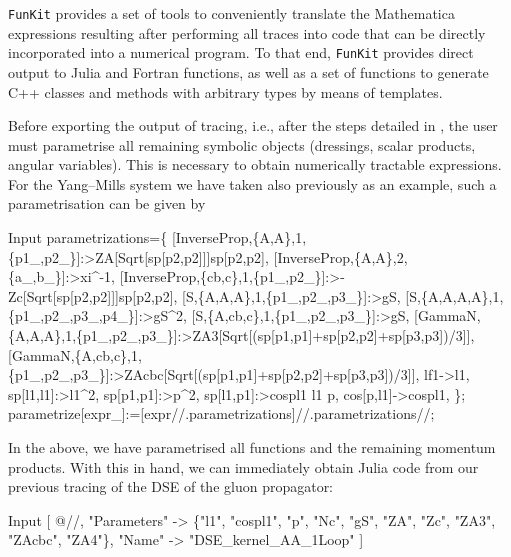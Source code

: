 \documentclass[preprint,10pt,sort&compress]{elsarticle}
\newcommand{\mathem}{\mmaInlineCell{Code}}
\newcommand{\FunKit}{\texttt{FunKit}\xspace}
\begin{document}
\FunKit provides a set of tools to conveniently translate the Mathematica expressions resulting after performing all traces into code that can be directly incorporated into a numerical program.
To that end, \FunKit provides direct output to Julia and Fortran functions, as well as a set of functions to generate C++ classes and methods with arbitrary types by means of templates.

Before exporting the output of tracing, i.e., after the steps detailed in , the user must parametrise all remaining symbolic objects (dressings, scalar products, angular variables). This is necessary to obtain numerically tractable expressions. For the Yang--Mills system we have taken also previously as an example, such a parametrisation can be given by
%
\begin{mmaCell}{Input}
parametrizations=\{
	[InverseProp,\{A,A\},1,\{p1_,p2_\}]:>ZA[Sqrt[sp[p2,p2]]]sp[p2,p2],
	[InverseProp,\{A,A\},2,\{a_,b_\}]:>xi^-1,
	[InverseProp,\{cb,c\},1,\{p1_,p2_\}]:>-Zc[Sqrt[sp[p2,p2]]]sp[p2,p2],
	[S,\{A,A,A\},1,\{p1_,p2_,p3_\}]:>gS,
	[S,\{A,A,A,A\},1,\{p1_,p2_,p3_,p4_\}]:>gS^2,
	[S,\{A,cb,c\},1,\{p1_,p2_,p3_\}]:>gS,
	[GammaN,\{A,A,A\},1,\{p1_,p2_,p3_\}]:>ZA3[Sqrt[(sp[p1,p1]+sp[p2,p2]+sp[p3,p3])/3]],
	[GammaN,\{A,cb,c\},1,\{p1_,p2_,p3_\}]:>ZAcbc[Sqrt[(sp[p1,p1]+sp[p2,p2]+sp[p3,p3])/3]],
	lf1->l1,
	sp[l1,l1]:>l1^2, sp[p1,p1]:>p^2, sp[l1,p1]:>cospl1 l1 p,
	cos[p,l1]->cospl1,
 \};
parametrize[expr_]:=[expr//.parametrizations]//.parametrizations//;
\end{mmaCell}
%
In the above, we have parametrised all \mathem{\mmaDef{dressing}} functions and the remaining momentum products. With this in hand, we can immediately obtain Julia code from our previous tracing of the DSE of the gluon propagator:
%
\begin{mmaCell}{Input}
[
  @//,
  "Parameters" -> \{"l1", "cospl1", "p", "Nc", "gS", "ZA", "Zc", "ZA3", "ZAcbc", "ZA4"\},
  "Name" -> "DSE_kernel_AA_1Loop"
 ]
\end{mmaCell}
%
\end{document}
